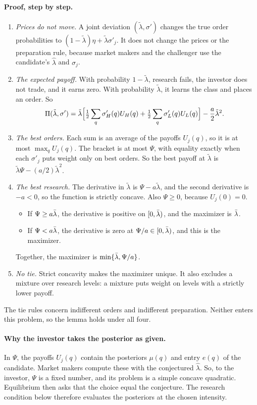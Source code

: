 \paragraph{Proof, step by step.}
\begin{enumerate}
\item \emph{Prices do not move.} A joint deviation \((\tilde\lambda,\sigma')\) changes the true order probabilities to
\((1-\tilde\lambda)\eta+\tilde\lambda\sigma'_j\). It does not change the prices or the preparation rule, because
market makers and the challenger use the candidate's \(\hat\lambda\) and \(\sigma_j\).
\item \emph{The expected payoff.} With probability \(1-\tilde\lambda\), research fails, the investor does not trade,
and it earns zero. With probability \(\tilde\lambda\), it learns the class and places an order. So
\[
\Pi(\tilde\lambda,\sigma')=\tilde\lambda\Bigl[\tfrac12\sum_q\sigma'_H(q)U_H(q)+\tfrac12\sum_q\sigma'_L(q)U_L(q)\Bigr]
-\frac a2\tilde\lambda^2 .
\]
\item \emph{The best orders.} Each sum is an average of the payoffs \(U_j(q)\), so it is at most \(\max_qU_j(q)\). The
bracket is at most \(\Psi\), with equality exactly when each \(\sigma'_j\) puts weight only on best orders. So the best
payoff at \(\tilde\lambda\) is \(\tilde\lambda\Psi-(a/2)\tilde\lambda^2\).
\item \emph{The best research.} The derivative in \(\tilde\lambda\) is \(\Psi-a\tilde\lambda\), and the second
derivative is \(-a<0\), so the function is strictly concave. Also \(\Psi\ge0\), because \(U_j(0)=0\).
\begin{itemize}
\item If \(\Psi\ge a\bar\lambda\), the derivative is positive on \([0,\bar\lambda)\), and the maximizer is \(\bar\lambda\).
\item If \(\Psi<a\bar\lambda\), the derivative is zero at \(\Psi/a\in[0,\bar\lambda)\), and this is the maximizer.
\end{itemize}
Together, the maximizer is \(\min\{\bar\lambda,\Psi/a\}\).
\item \emph{No tie.} Strict concavity makes the maximizer unique. It also excludes a mixture over research levels: a
mixture puts weight on levels with a strictly lower payoff.
\end{enumerate}
The tie rules concern indifferent orders and indifferent preparation. Neither enters this problem, so the lemma holds
under all four.

\paragraph{Why the investor takes the posterior as given.} In \(\Psi\), the payoffs \(U_j(q)\) contain the posteriors
\(\mu(q)\) and entry \(e(q)\) of the candidate. Market makers compute these with the conjectured \(\hat\lambda\). So,
to the investor, \(\Psi\) is a fixed number, and its problem is a simple concave quadratic. Equilibrium then asks that
the choice equal the conjecture. The research condition below therefore evaluates the posteriors at the chosen
intensity.

